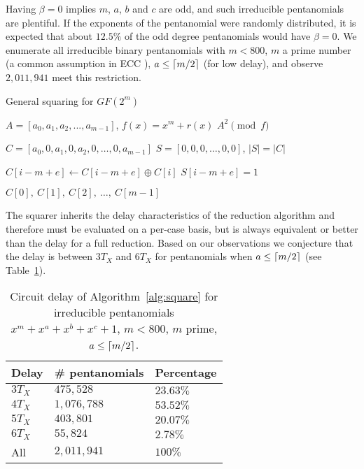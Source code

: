 Having $\beta=0$ implies $m$, $a$, $b$ and $c$ are odd, and such irreducible pentanomials are plentiful. If the exponents of the pentanomial were randomly distributed, it is expected that about $12.5\%$ of the odd degree pentanomials would have $\beta=0$. We enumerate all irreducible binary pentanomials with $m < 800$, $m$ a prime number (a common assumption in ECC \cite{doche2005redundant}), $a \leq \lceil m/2\rceil$ (for low delay), and observe $2,011,941$ meet this restriction. \\

\begin{algorithm}
\caption{General squaring for $GF(2^m)$}
\label{alg:square}
\begin{algorithmic}[1]
\REQUIRE $A = [a_0, a_1, a_2, ..., a_{m-1}]$, $f(x) = x^m + r(x)$
\ENSURE $A^2 \pmod f$

\STATE $C = [a_0, 0, a_1, 0, a_2, 0, \ldots, 0, a_{m-1}]$ 
\STATE $S = [0, 0, 0, \ldots, 0, 0]$, $|S| = |C|$

         
    \ELSE
                 
            \ELSE
                \STATE $C[i-m+e] \leftarrow C[i-m+e] \oplus C[i]$ 
            \ENDIF
            \STATE $S[i-m+e] = 1$
        \ENDFOR
    \ENDIF
\ENDFOR

\RETURN $C[0],~C[1],~C[2],~\ldots,~C[m-1]$
\end{algorithmic}
\end{algorithm}

The squarer inherits the delay characteristics of the reduction algorithm and therefore must be evaluated on a per-case basis, but is always equivalent or better than the delay for a full reduction. Based on our observations we conjecture that the delay is between $3 T_X$ and $6 T_X$ for pentanomials when $a \leq \lceil m/2\rceil$ (see Table~\ref{table:square:delays}). \\

\begin{table}
\centering
\caption{Circuit delay of Algorithm~\ref{alg:square} for irreducible pentanomials $x^m + x^a + x^b + x^c + 1$, $m < 800$, $m$ prime, $a \leq \lceil m/2\rceil$.}
{\begin{tabular}{l l l} \label{table:square:delays}
Delay & \# pentanomials & Percentage \\ \hline
$3 T_X$ & $475,528$ & $23.63\%$ \\ \hline
$4 T_X$ & $1,076,788$ & $53.52\%$ \\ \hline
$5 T_X$ & $403,801$ & $20.07\%$ \\ \hline 
$6 T_X$ & $55,824$ & $2.78\%$ \\ \hline
All & $2,011,941$ & $100\%$
\end{tabular}}{}
\end{table}

